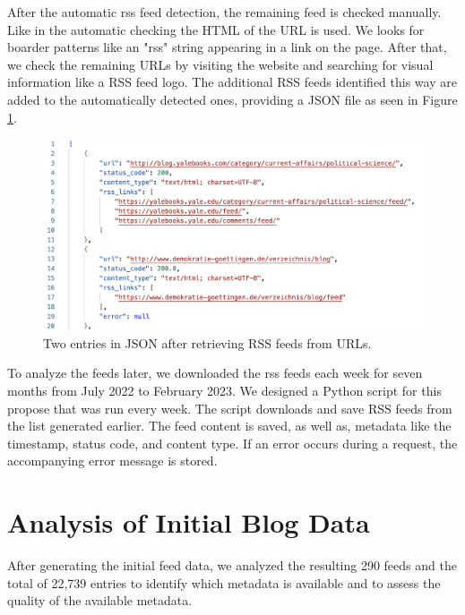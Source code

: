 \documentclass{article}
\begin{document}
After the automatic rss feed detection, the remaining feed is checked manually. Like in the automatic checking the HTML of the URL is used. We looks for boarder patterns like an "rss" string appearing in a link on the page. After that, we check the remaining URLs by visiting the website and searching for visual information like a RSS feed logo. The additional RSS feeds identified this way are added to the automatically detected ones, providing a JSON file as seen in Figure \ref{code:rss_list_json}.
\begin{figure}[htb]
	\includegraphics[width=.7\textwidth]{figures/rss_list_json.png}
	\caption{Two entries in JSON after retrieving RSS feeds from URLs.}
	\label{code:rss_list_json}
\end{figure}

To analyze the feeds later, we downloaded the rss feeds each week for seven months from July 2022 to February 2023. We designed a Python script for this propose that was run every week. The script downloads and save RSS feeds from the list generated earlier. The feed content is saved, as well as, metadata like the timestamp, status code, and content type. If an error occurs during a request, the accompanying error message is stored.

\section{Analysis of Initial Blog Data}\label{sec:analysis}

After generating the initial feed data, we analyzed the resulting 290 feeds and the total of 22,739 entries to identify which metadata is available and to assess the quality of the available metadata.
\end{document}
